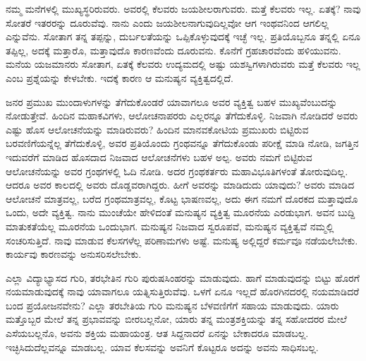 ನಮ್ಮ ಮನೆಗಳಲ್ಲಿ ಮುಖ್ಯಸ್ಥರಿರುವರು. ಅವರಲ್ಲಿ ಕೆಲವರು ಜಯಶೀಲರಾಗುವರು. ಮತ್ತೆ ಕೆಲವರು ಇಲ್ಲ. ಏತಕ್ಕೆ? ನಾವು ಸೋತರೆ ಇತರರನ್ನು ದೂರುವೆವು. ನಾನು ಎಂದು ಜಯಶೀಲನಾಗುವುದಿಲ್ಲವೋ ಆಗ ಇಂಥವನಿಂದ ಆಗಲಿಲ್ಲ ಎನ್ನುವೆನು. ಸೋತಾಗ ತನ್ನ ತಪ್ಪನ್ನು, ದುರ್ಬಲತೆಯನ್ನು ಒಪ್ಪಿಕೊಳ್ಳುವುದಕ್ಕೆ ಇಚ್ಛೆ ಇಲ್ಲ. ಪ್ರತಿಯೊಬ್ಬನೂ ತನ್ನಲ್ಲಿ ಏನೂ ತಪ್ಪಿಲ್ಲ, ಅದಕ್ಕೆ ಮತ್ತಾರೊ, ಮತ್ತಾವುದೊ ಕಾರಣವೆಂದು ದೂರುವನು. ಕೊನೆಗೆ ಗ್ರಹಚಾರವೆಂದು ಹಳಿಯುವನು. ಮನೆಯ ಯಜಮಾನರು ಸೋತಾಗ, ಏತಕ್ಕೆ ಕೆಲವರು ಉದ್ಯಮದಲ್ಲಿ ಅಷ್ಟು ಯಶಸ್ವಿಗಳಾಗಿರುವರು ಮತ್ತೆ ಕೆಲವರು ಇಲ್ಲ ಎಂಬ ಪ್ರಶ್ನೆಯನ್ನು ಕೇಳಬೇಕು. ಇದಕ್ಕೆ ಕಾರಣ ಆ ಮನುಷ್ಯನ ವ್ಯಕ್ತಿತ್ವದಲ್ಲಿದೆ.

ಜನರ ಪ್ರಮುಖ ಮುಂದಾಳುಗಳನ್ನು ತೆಗೆದುಕೊಂಡರೆ ಯಾವಾಗಲೂ ಅವರ ವ್ಯಕ್ತಿತ್ವ ಬಹಳ ಮುಖ್ಯವೆಂಬುದನ್ನು ನೋಡುತ್ತೇವೆ. ಹಿಂದಿನ ಮಹಾಕವಿಗಳು, ಆಲೋಚನಾಪರರು ಎಲ್ಲರನ್ನೂ ತೆಗೆದುಕೊಳ್ಳಿ. ನಿಜವಾಗಿ ನೋಡಿದರೆ ಅವರು ಎಷ್ಟು ಹೊಸ ಆಲೋಚನೆಯನ್ನು ಮಾಡಿರುವರು? ಹಿಂದಿನ ಮಾನವಕೋಟಿಯ ಪ್ರಮುಖರು ಬಿಟ್ಟಿರುವ ಬರವಣಿಗೆಯನ್ನೆಲ್ಲ ತೆಗೆದುಕೊಳ್ಳಿ, ಅವರ ಪ್ರತಿಯೊಂದು ಗ್ರಂಥವನ್ನೂ ತೆಗೆದುಕೊಂಡು ಪರೀಕ್ಷೆ ಮಾಡಿ ನೋಡಿ, ಜಗತ್ತಿನ ಇದುವರೆಗೆ ಮಾಡಿದ ಹೊಸದಾದ ನಿಜವಾದ ಆಲೋಚನೆಗಳು ಬಹಳ ಅಲ್ಪ. ಅವರು ನಮಗೆ ಬಿಟ್ಟಿರುವ ಆಲೋಚನೆಯನ್ನು ಅವರ ಗ್ರಂಥಗಳಲ್ಲಿ ಓದಿ ನೋಡಿ. ಅದರ ಗ್ರಂಥಕರ್ತರು ಮಹಾವಿಭೂತಿಗಳಂತೆ ತೋರುವುದಿಲ್ಲ. ಆದರೂ ಅವರ ಕಾಲದಲ್ಲಿ ಅವರು ದೊಡ್ಡವರಾಗಿದ್ದರು. ಹೀಗೆ ಅವರನ್ನು ಮಾಡಿದುದು ಯಾವುದು? ಅವರು ಮಾಡಿದ ಆಲೋಚನೆ ಮಾತ್ರವಲ್ಲ, ಬರೆದ ಗ್ರಂಥಮಾತ್ರವಲ್ಲ, ಕೊಟ್ಟ ಭಾಷಣವಲ್ಲ, ಅದು ಈಗ ನಮಗೆ ದೊರಕದ ಮತ್ತಾವುದೊ ಒಂದು, ಅದೇ ವ್ಯಕ್ತಿತ್ವ. ನಾನು ಮುಂಚೆಯೇ ಹೇಳಿದಂತೆ ಮನುಷ್ಯನ ವ್ಯಕ್ತಿತ್ವ ಮೂರನೆಯ ಎರಡುಭಾಗ. ಅವನ ಬುದ್ದಿ ಮಾತುಕತೆಯೆಲ್ಲ ಮೂರನೆಯ ಒಂದುಭಾಗ. ಮನುಷ್ಯನ ನಿಜವಾದ ಸ್ವರೂಪವೆ, ಮನುಷ್ಯನ ವ್ಯಕ್ತಿತ್ವವೆ ನಮ್ಮಲ್ಲಿ ಸಂಚರಿಸುತ್ತಿದೆ. ನಾವು ಮಾಡುವ ಕೆಲಸಗಳೆಲ್ಲ ಪರಿಣಾಮಗಳು ಅಷ್ಟೆ. ಮನುಷ್ಯ ಅಲ್ಲಿದ್ದರೆ ಕರ್ಮವೂ ನಡೆಯಲೇಬೇಕು. ಕಾರ್ಯವು ಕಾರಣವನ್ನು ಅನುಸರಿಸಲೇಬೇಕು.

ಎಲ್ಲಾ ವಿದ್ಯಾಭ್ಯಾಸದ ಗುರಿ, ತರಭೇತಿನ ಗುರಿ ಪುರುಷಸಿಂಹರನ್ನು ಮಾಡುವುದು. ಹಾಗೆ ಮಾಡುವುದನ್ನು ಬಿಟ್ಟು ಹೊರಗೆ ನಯಮಾಡುವುದಕ್ಕೆ ನಾವು ಯಾವಾಗಲೂ ಯತ್ನಿಸುತ್ತಿರುವೆವು. ಒಳಗೆ ಏನೂ ಇಲ್ಲದೆ ಹೊರಗಿನದರಲ್ಲಿ ನಯಮಾಡಿದರೆ ಬಂದ ಪ್ರಯೋಜನವೇನು? ಎಲ್ಲಾ ತರಬೇತಿಯ ಗುರಿ ಮನುಷ್ಯನ ಬೆಳವಣಿಗೆಗೆ ಸಹಾಯ ಮಾಡುವುದು. ಯಾರು ಮತ್ತೊಬ್ಬರ ಮೇಲೆ ತನ್ನ ಪ್ರಭಾವವನ್ನು ಬೀರಬಲ್ಲನೋ, ಯಾರು ತನ್ನ ಮಂತ್ರಶಕ್ತಿಯನ್ನು ತನ್ನ ಸಹೋದರರ ಮೇಲೆ ಎಸೆಯಬಲ್ಲನೊ, ಅವನು ಶಕ್ತಿಯ ಮಹಾಯಂತ್ರ. ಆತ ಸಿದ್ದನಾದರೆ ಏನನ್ನು ಬೇಕಾದರೂ ಮಾಡಬಲ್ಲ. ಇಚ್ಛಿಸಿದುದೆಲ್ಲವನ್ನೂ ಮಾಡಬಲ್ಲ. ಯಾವ ಕೆಲಸವನ್ನು ಅವನಿಗೆ ಕೊಟ್ಟರೂ ಅದನ್ನು ಅವನು ಸಾಧಿಸಬಲ್ಲ.

